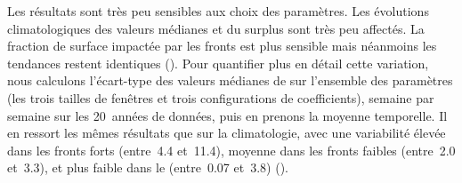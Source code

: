 \begin{table}
  \centering
  \caption[]{%
    Coefficients de normalisation pour les différents paramètres utilisés.
  }
  \label{tab:coefs}
\end{table}

Les résultats sont très peu sensibles aux choix des paramètres.
Les évolutions climatologiques des valeurs médianes et du surplus sont très peu affectés. La fraction de surface impactée par les fronts est plus sensible mais néanmoins les tendances restent identiques ().
Pour quantifier plus en détail cette variation, nous calculons l'écart-type des valeurs médianes de  sur l'ensemble des paramètres (les trois tailles de fenêtres et trois configurations de coefficients), semaine par semaine sur les 20~années de données, puis en prenons la moyenne temporelle.
Il en ressort les mêmes résultats que sur la climatologie, avec une variabilité élevée dans les fronts forts (entre~\qty{4.4}{\mugm} et~\qty{11.4}{\mugm}), moyenne dans les fronts faibles (entre~\qty{2.0}{\mugm} et~\qty{3.3}{\mugm}), et plus faible dans le  (entre~\qty{0.07}{\mugm} et~\qty{3.8}{\mugm}) ().

